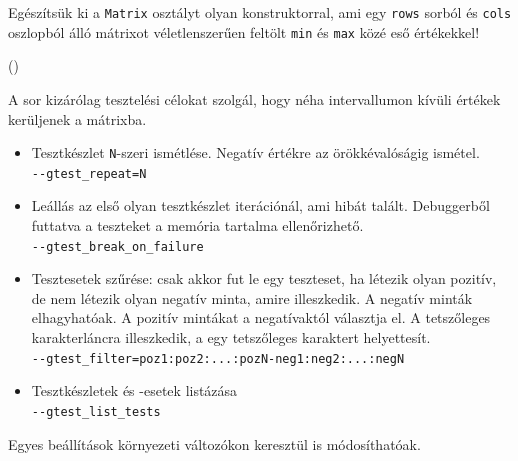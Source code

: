 \begin{frame}
  Egészítsük ki a \texttt{Matrix} osztályt olyan konstruktorral, ami egy \texttt{rows} sorból és \texttt{cols} oszlopból álló 
mátrixot véletlenszerűen feltölt \texttt{min} és \texttt{max} közé eső értékekkel!
  \begin{exampleblock}{ %
    ()}
    
    
    
  \end{exampleblock}
\end{frame}

\begin{frame}
  \begin{exampleblock}{}
    \scriptsize
    
  \end{exampleblock}
  A  sor kizárólag tesztelési célokat szolgál, hogy néha intervallumon kívüli értékek kerüljenek a mátrixba.
\end{frame}

\begin{frame}
  \begin{exampleblock}{}
    \scriptsize
    
  \end{exampleblock}
\end{frame}

\begin{frame}
  \begin{itemize}
    \item Tesztkészlet \texttt{N}-szeri ismétlése. Negatív értékre az örökkévalóságig ismétel. \\ 
      \texttt{{-}-gtest\_repeat=N}
    \item Leállás az első olyan tesztkészlet iterációnál, ami hibát talált. Debuggerből futtatva a teszteket a memória tartalma 
ellenőrizhető. \\ \texttt{{-}-gtest\_break\_on\_failure}
    \item Tesztesetek szűrése: csak akkor fut le egy teszteset, ha létezik olyan pozitív, de nem létezik olyan negatív minta, 
amire illeszkedik. A negatív minták elhagyhatóak. A pozitív mintákat a 
negatívaktól \kiemel{-} választja el. A \kiemel{*} tetszőleges karakterláncra illeszkedik, a  egy tetszőleges 
karaktert helyettesít. \\ \texttt{{-}-gtest\_filter=poz1:poz2:...:pozN-neg1:neg2:...:negN}
    \item Tesztkészletek és -esetek listázása \\ \texttt{{-}-gtest\_list\_tests}
  \end{itemize}
  Egyes beállítások környezeti változókon keresztül is módosíthatóak.
\end{frame}

